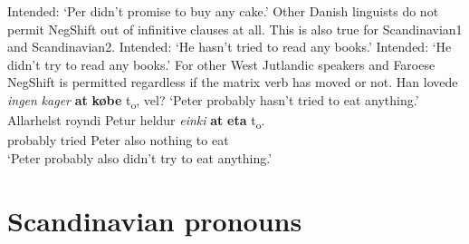 \documentclass[12pt, letterpaper]{article}
\begin{document}
	\glt Intended: `Per didn't promise to buy any cake.'
	\z 
\ex Other Danish linguists do not permit NegShift out of infinitive clauses at all. This is also true for Scandinavian1 and Scandinavian2.
	\glt Intended: `He hasn't tried to read any books.'
	\glt Intended: `He didn't try to read any books.'
 	\z 
\ex For other West Jutlandic speakers and Faroese NegShift is permitted regardless if the matrix verb has moved or not.
	\ex Han lovede \textit{ingen} \textit{kager} \textbf{at} \textbf{købe} t\textsubscript{o}, vel?
	\glt `Peter probably hasn't tried to eat anything.'
	\ex 
	\gll Allarhelst royndi Petur heldur \textit{einki} \textbf{at} \textbf{eta} t\textsubscript{o}.\\
	probably tried Peter also nothing to eat\\
	\glt `Peter probably also didn't try to eat anything.'
	\z 
\z 


\section{Scandinavian pronouns} \label{sec:PRONOUNS}
\end{document}
